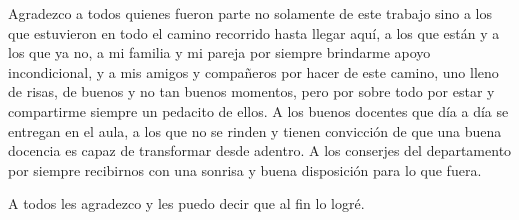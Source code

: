 \documentclass[dosguias,openany]{tesisusach}
\begin{document}
	\begin{agradecimiento}
		Agradezco a todos quienes fueron parte no solamente de este trabajo sino a los que estuvieron en todo el camino recorrido hasta llegar aquí, a los que están y a los que ya no, a mi familia y mi pareja por siempre brindarme apoyo incondicional, y a mis amigos y compañeros por hacer de este camino, uno lleno de risas, de buenos y no tan buenos momentos, pero por sobre todo por estar y compartirme siempre un pedacito de ellos. A los buenos docentes que día a día se entregan en el aula, a los que no se rinden y tienen convicción de que una buena docencia es capaz de transformar desde adentro. A los conserjes del departamento por siempre recibirnos con una sonrisa y buena disposición para lo que fuera.

        A todos les agradezco y les puedo decir que al fin lo logré.
	\end{agradecimiento}

	\tableofcontents
	\newpage
	\listoftables
	\newpage
	\listoffigures
	\newpage

	\mainmatter
	
	
	
    
	
    
    
    

	\printbibliography[heading=bibintoc]
	
	\appendix

	\annex
	
	
	
	
\end{document}
